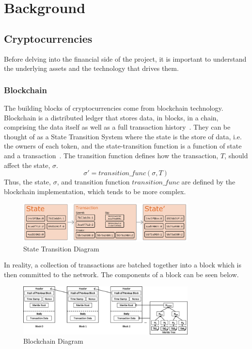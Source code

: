 \chapter{Background}
\section{Cryptocurrencies}
Before delving into the financial side of the project, it is important to understand the underlying assets and the technology that drives them.

\subsection{Blockchain}
The building blocks of cryptocurrencies come from blockchain technology. Blockchain is a distributed ledger that stores data, in blocks, in a chain, comprising the data itself as well as a full transaction history~\cite{nofer2017blockchain}. They can be thought of as a State Transition System where the state is the store of data, i.e. the owners of each token, and the state-transition function is a function of state and a transaction~\cite{ethereum_whitepaper}. The transition function defines how the transaction, $T$, should affect the state, $\sigma$. $$\sigma' = transition\_func(\sigma, T)$$Thus, the state, $\sigma$, and transition function $transition\_func$ are defined by the blockchain implementation, which tends to be more complex.

\begin{figure}[!htb]
    \centering
    \includegraphics[width=0.8\textwidth]{background/Images/ethereum-state-transition.png}
    \caption{State Transition Diagram~\cite{ethereum_whitepaper}}
\end{figure}

\noindent In reality, a collection of transactions are batched together into a block which is then committed to the network. The components of a block can be seen below.

\begin{figure}[!htb]
    \centering
    \includegraphics[width=0.8\textwidth]{background/Images/The-structure-of-a-Blockchain.png}
    \caption{Blockchain Diagram~\cite{inbookBlockchain}}
\end{figure}

